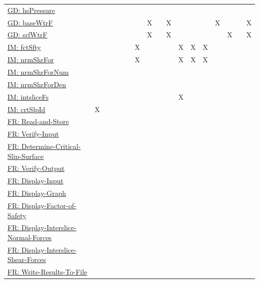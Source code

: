 \documentclass[12pt]{article}
\begin{document}
\begin{longtable}{l l l l l l l l l l l l l l l l l}
\\
\hyperref[GD:hsPressure]{GD: hsPressure} &  &  &  &  &  &  &  &  &  &  &  &  &  &  &  & 
\\
\hyperref[GD:baseWtrF]{GD: baseWtrF} &  &  &  &  &  &  & X &  & X &  &  &  & X &  &  & X
\\
\hyperref[GD:srfWtrF]{GD: srfWtrF} &  &  &  &  &  &  & X &  & X &  &  &  &  & X &  & X
\\
\hyperref[IM:fctSfty]{IM: fctSfty} &  &  &  &  &  & X &  &  &  & X & X & X &  &  &  & 
\\
\hyperref[IM:nrmShrFor]{IM: nrmShrFor} &  &  &  &  &  & X &  &  &  & X & X & X &  &  &  & 
\\
\hyperref[IM:nrmShrForNum]{IM: nrmShrForNum} &  &  &  &  &  &  &  &  &  &  &  &  &  &  &  & 
\\
\hyperref[IM:nrmShrForDen]{IM: nrmShrForDen} &  &  &  &  &  &  &  &  &  &  &  &  &  &  &  & 
\\
\hyperref[IM:intsliceFs]{IM: intsliceFs} &  &  &  &  &  &  &  &  &  & X &  &  &  &  &  & 
\\
\hyperref[IM:crtSlpId]{IM: crtSlpId} & X &  &  &  &  &  &  &  &  &  &  &  &  &  &  & 
\\
\hyperref[readAndStore]{FR: Read-and-Store} &  &  &  &  &  &  &  &  &  &  &  &  &  &  &  & 
\\
\hyperref[verifyInput]{FR: Verify-Input} &  &  &  &  &  &  &  &  &  &  &  &  &  &  &  & 
\\
\hyperref[determineCritSlip]{FR: Determine-Critical-Slip-Surface} &  &  &  &  &  &  &  &  &  &  &  &  &  &  &  & 
\\
\hyperref[verifyOutput]{FR: Verify-Output} &  &  &  &  &  &  &  &  &  &  &  &  &  &  &  & 
\\
\hyperref[displayInput]{FR: Display-Input} &  &  &  &  &  &  &  &  &  &  &  &  &  &  &  & 
\\
\hyperref[displayGraph]{FR: Display-Graph} &  &  &  &  &  &  &  &  &  &  &  &  &  &  &  & 
\\
\hyperref[displayFS]{FR: Display-Factor-of-Safety} &  &  &  &  &  &  &  &  &  &  &  &  &  &  &  & 
\\
\hyperref[displayNormal]{FR: Display-Interslice-Normal-Forces} &  &  &  &  &  &  &  &  &  &  &  &  &  &  &  & 
\\
\hyperref[displayShear]{FR: Display-Interslice-Shear-Forces} &  &  &  &  &  &  &  &  &  &  &  &  &  &  &  & 
\\
\hyperref[writeToFile]{FR: Write-Results-To-File} &  &  &  &  &  &  &  &  &  &  &  &  &  &  &  & 

\end{longtable}
\end{document}
